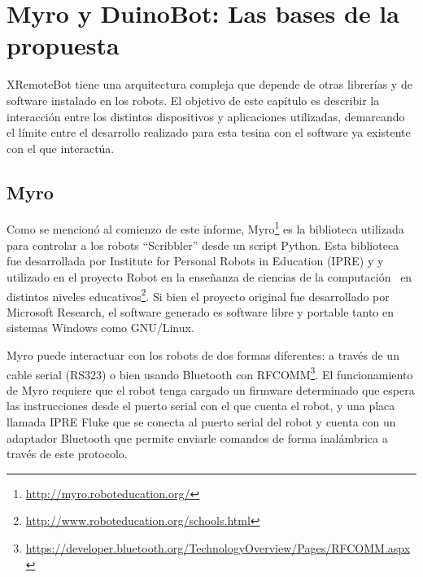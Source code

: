 \chapter{Myro y DuinoBot: Las bases de la propuesta}\label{cha:myro_y_duinobot}




XRemoteBot tiene una arquitectura compleja que
depende de otras librerías y de software instalado en los robots.
El objetivo de este capítulo es describir la interacción entre los
distintos dispositivos y aplicaciones utilizadas, demarcando el límite
entre el desarrollo realizado para esta tesina con el software ya
existente con el que interactúa.

\section{Myro}\label{sec:myro}

Como se mencionó al comienzo de este informe,
Myro\footnote{\url{http://myro.roboteducation.org/}}
es la biblioteca utilizada para controlar a los robots
``Scribbler''
desde un script Python. Esta biblioteca fue desarrollada por
Institute for Personal Robots in Education (IPRE) y
y utilizado en el proyecto Robot en la enseñanza de ciencias
de la computación~\citep{kumar_2009}
en distintos niveles
educativos\footnote{\url{http://www.roboteducation.org/schools.html}}.
Si bien el proyecto original fue desarrollado por Microsoft Research,
el software generado es software libre y portable tanto en sistemas Windows
como GNU/Linux.

Myro puede interactuar con los robots de dos
formas diferentes: a través de un cable serial (RS323) o bien usando Bluetooth
con RFCOMM\footnote{\url{https://developer.bluetooth.org/TechnologyOverview/Pages/RFCOMM.aspx}}.
El funcionamiento de Myro requiere que el robot tenga
cargado un firmware determinado que espera las instrucciones desde el puerto
serial con el que cuenta el robot, y una placa llamada IPRE Fluke que se conecta
al puerto serial del robot y cuenta con un adaptador Bluetooth que permite
enviarle comandos de forma inalámbrica a través de este protocolo.

